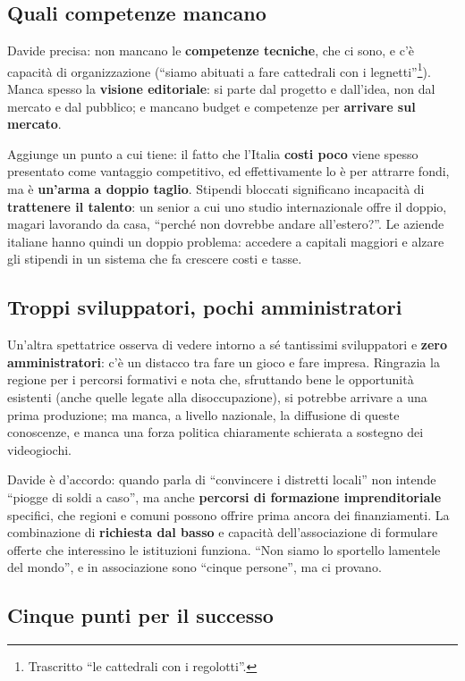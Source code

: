 \subsection{Quali competenze mancano}

Davide precisa: non mancano le \textbf{competenze tecniche}, che ci sono, e c'è
capacità di organizzazione (``siamo abituati a fare cattedrali con i
legnetti''\footnote{Trascritto ``le cattedrali con i regolotti''.}). Manca spesso la
\textbf{visione editoriale}: si parte dal progetto e dall'idea, non dal mercato e
dal pubblico; e mancano budget e competenze per \textbf{arrivare sul mercato}.

Aggiunge un punto a cui tiene: il fatto che l'Italia \textbf{costi poco} viene
spesso presentato come vantaggio competitivo, ed effettivamente lo è per attrarre
fondi, ma è \textbf{un'arma a doppio taglio}. Stipendi bloccati significano
incapacità di \textbf{trattenere il talento}: un senior a cui uno studio
internazionale offre il doppio, magari lavorando da casa, ``perché non dovrebbe
andare all'estero?''. Le aziende italiane hanno quindi un doppio problema: accedere
a capitali maggiori e alzare gli stipendi in un sistema che fa crescere costi e
tasse.

\subsection{Troppi sviluppatori, pochi amministratori}

Un'altra spettatrice osserva di vedere intorno a sé tantissimi sviluppatori e
\textbf{zero amministratori}: c'è un distacco tra fare un gioco e fare impresa.
Ringrazia la regione per i percorsi formativi e nota che, sfruttando bene le
opportunità esistenti (anche quelle legate alla disoccupazione), si potrebbe
arrivare a una prima produzione; ma manca, a livello nazionale, la diffusione di
queste conoscenze, e manca una forza politica chiaramente schierata a sostegno dei
videogiochi.

Davide è d'accordo: quando parla di ``convincere i distretti locali'' non intende
``piogge di soldi a caso'', ma anche \textbf{percorsi di formazione
imprenditoriale} specifici, che regioni e comuni possono offrire prima ancora dei
finanziamenti. La combinazione di \textbf{richiesta dal basso} e capacità
dell'associazione di formulare offerte che interessino le istituzioni funziona. ``Non
siamo lo sportello lamentele del mondo'', e in associazione sono ``cinque
persone'', ma ci provano.

\subsection{Cinque punti per il successo}

